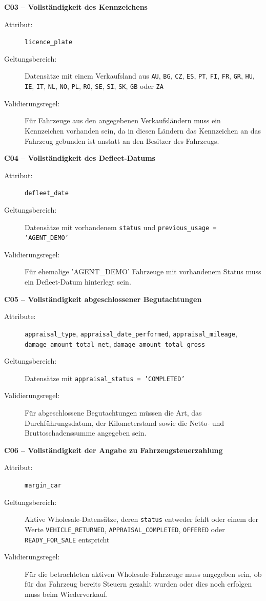 \documentclass[../main.tex]{subfiles}
\begin{document}
\medskip 
\noindent\textbf{C03 -- Vollständigkeit des Kennzeichens} 
\begin{description} 
    \item[Attribut:] \texttt{licence\_plate} 
    \item[Geltungsbereich:] Datensätze mit einem Verkaufsland aus \texttt{AU}, \texttt{BG}, \texttt{CZ}, \texttt{ES}, \texttt{PT}, \texttt{FI}, \texttt{FR}, \texttt{GR}, \texttt{HU}, \texttt{IE}, \texttt{IT}, \texttt{NL}, \texttt{NO}, \texttt{PL}, \texttt{RO}, \texttt{SE}, \texttt{SI}, \texttt{SK}, \texttt{GB} oder \texttt{ZA} 
    \item[Validierungsregel:] Für Fahrzeuge aus den angegebenen Verkaufsländern muss ein Kennzeichen vorhanden sein, da in diesen Ländern das Kennzeichen an das Fahrzeug gebunden ist anstatt an den Besitzer des Fahrzeugs.
\end{description} 

\medskip 
\noindent\textbf{C04 -- Vollständigkeit des Defleet-Datums} 
\begin{description}  
    \item[Attribut:] \texttt{defleet\_date} 
    \item[Geltungsbereich:] Datensätze mit vorhandenem \texttt{status} und \texttt{previous\_usage = 'AGENT\_DEMO'} 
    \item[Validierungsregel:] Für ehemalige 'AGENT\_DEMO' Fahrzeuge mit vorhandenem Status muss ein Defleet-Datum hinterlegt sein. 
\end{description} 

\medskip 
\noindent\textbf{C05 -- Vollständigkeit abgeschlossener Begutachtungen} 
\begin{description} 
    \item[Attribute:] \texttt{appraisal\_type}, \texttt{appraisal\_date\_performed}, \texttt{appraisal\_mileage}, \\ \texttt{damage\_amount\_total\_net}, \texttt{damage\_amount\_total\_gross} 
    \item[Geltungsbereich:] Datensätze mit \texttt{appraisal\_status = 'COMPLETED'} 
    \item[Validierungsregel:] Für abgeschlossene Begutachtungen müssen die Art, das Durchführungsdatum, der Kilometerstand sowie die Netto- und Bruttoschadenssumme angegeben sein. 
\end{description} 

\medskip 
\noindent\textbf{C06 -- Vollständigkeit der Angabe zu Fahrzeugsteuerzahlung} 
\begin{description} 
    \item[Attribut:] \texttt{margin\_car} 
    \item[Geltungsbereich:] Aktive Wholesale-Datensätze, deren \texttt{status} entweder fehlt oder einem der Werte \texttt{VEHICLE\_RETURNED}, \texttt{APPRAISAL\_COMPLETED}, \texttt{OFFERED} oder \texttt{READY\_FOR\_SALE} entspricht 
    \item[Validierungsregel:] Für die betrachteten aktiven Wholesale-Fahrzeuge muss angegeben sein, ob für das Fahrzeug bereits Steuern gezahlt wurden oder dies noch erfolgen muss beim Wiederverkauf. 
\end{description} 
\end{document}
